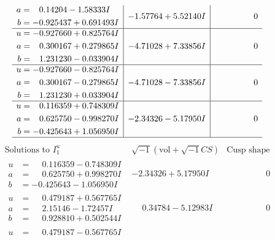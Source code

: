 \documentclass[1p]{elsarticle_modified}
\theoremstyle{definition}
\newcommand{\I}{\sqrt{-1}}
\begin{document}
$$\begin{array}{c|c|c}
\begin{aligned}
a &= \phantom{-}0.14204 - 1.58333 I \\
b &= -0.925437 + 0.691493 I\end{aligned}
 & -1.57764 + 5.52140 I & \phantom{-0.000000 } 0 \\ \hline\begin{aligned}
u &= -0.927660 + 0.825764 I \\
a &= \phantom{-}0.300167 + 0.279865 I \\
b &= \phantom{-}1.231230 - 0.033904 I\end{aligned}
 & -4.71028 + 7.33856 I & \phantom{-0.000000 } 0 \\ \hline\begin{aligned}
u &= -0.927660 - 0.825764 I \\
a &= \phantom{-}0.300167 - 0.279865 I \\
b &= \phantom{-}1.231230 + 0.033904 I\end{aligned}
 & -4.71028 - 7.33856 I & \phantom{-0.000000 } 0 \\ \hline\begin{aligned}
u &= \phantom{-}0.116359 + 0.748309 I \\
a &= \phantom{-}0.625750 - 0.998270 I \\
b &= -0.425643 + 1.056950 I\end{aligned}
 & -2.34326 - 5.17950 I & \phantom{-0.000000 } 0\\
 \hline 
 \end{array}$$\newpage$$\begin{array}{c|c|c}  
\text{Solutions to }I^u_{1}& \I (\text{vol} + \sqrt{-1}CS) & \text{Cusp shape}\\
 \hline 
\begin{aligned}
u &= \phantom{-}0.116359 - 0.748309 I \\
a &= \phantom{-}0.625750 + 0.998270 I \\
b &= -0.425643 - 1.056950 I\end{aligned}
 & -2.34326 + 5.17950 I & \phantom{-0.000000 } 0 \\ \hline\begin{aligned}
u &= \phantom{-}0.479187 + 0.567765 I \\
a &= \phantom{-}2.15146 - 1.72457 I \\
b &= \phantom{-}0.928810 + 0.502544 I\end{aligned}
 & \phantom{-}0.34784 - 5.12983 I & \phantom{-0.000000 } 0 \\ \hline\begin{aligned}
u &= \phantom{-}0.479187 - 0.567765 I \\

\end{aligned}
\end{array}$$
\end{document}
